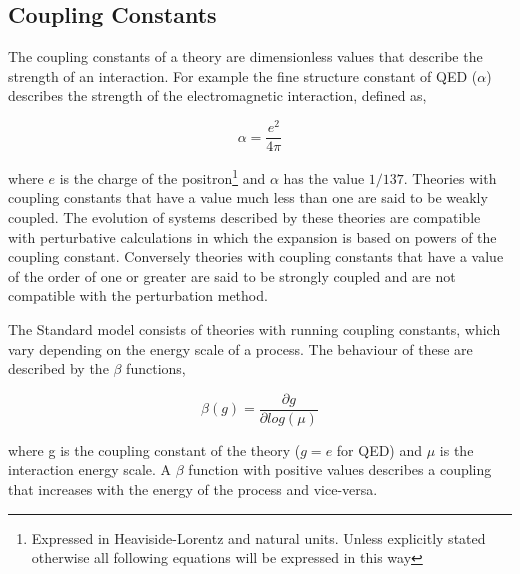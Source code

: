 \subsection{Coupling Constants}

The coupling constants of a theory are dimensionless values that describe the strength of an interaction. For example the fine structure constant of QED ($\alpha$) describes the strength of the electromagnetic interaction, defined as,

\begin{equation}
	\alpha = \frac{e^2}{4\pi}
	\label{equation: fine structure constant}
\end{equation}

where $e$ is the charge of the positron\footnote{Expressed in Heaviside-Lorentz and natural units. Unless explicitly stated otherwise all following equations will be expressed in this way} and $\alpha$ has the value $1/137$. Theories with coupling constants that have a value much less than one are said to be weakly coupled. The evolution of systems described by these theories are compatible with perturbative calculations in which the expansion is based on powers of the coupling constant. Conversely theories with coupling constants that have a value of the order of one or greater are said to be strongly coupled and are not compatible with the perturbation method.

The Standard model consists of theories with running coupling constants, which vary depending on the energy scale of a process. The behaviour of these are described by the $\beta$ functions,

\begin{equation}
	\beta(g) = \frac{\partial{g}}{\partial{log(\mu)}}
\end{equation}

where g is the coupling constant of the theory ($g = e$ for QED) and $\mu$ is the interaction energy scale. A $\beta$ function with positive values describes a coupling that increases with the energy of the process and vice-versa. 